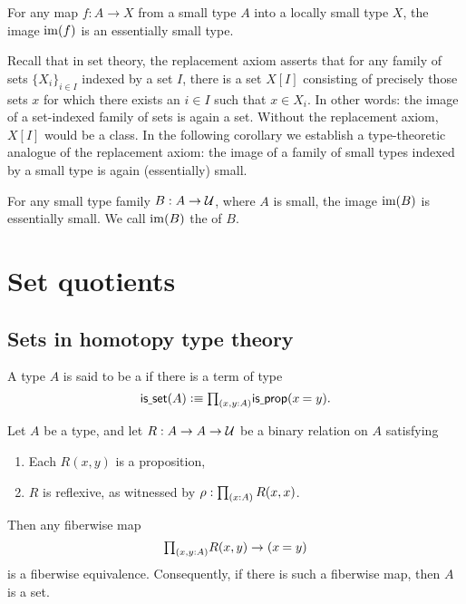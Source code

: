 \begin{thm}\label{thm:image_small}
For any map $f:A\to X$ from a small type $A$ into a locally small type $X$, the image $\operatorname{im}(f)$ is an essentially small type.
\end{thm}

Recall that in set theory, the replacement axiom asserts that for any family of sets $\{X_i\}_{i\in I}$ indexed by a set $I$, there is a set $X[I]$ consisting of precisely those sets $x$ for which there exists an $i\in I$ such that $x\in X_i$. In other words: the image of a set-indexed family of sets is again a set. Without the replacement axiom, $X[I]$ would be a class. In the following corollary we establish a type-theoretic analogue of the replacement axiom: the image of a family of small types indexed by a small type is again (essentially) small.

\begin{cor}\label{cor:im_small}
For any small type family $B:A\to\mathcal{U}$, where $A$ is small, the image $\operatorname{im}(B)$ is essentially small. We call $\operatorname{im}(B)$ the  of $B$. 
\end{cor}

\section{Set quotients}

\subsection{Sets in homotopy type theory}
\begin{defn}
A type $A$ is said to be a  if there is a term of type
\begin{equation*}
\isset(A)\defeq \prd{x,y:A}\isprop(\id{x}{y}).
\end{equation*}
\end{defn}

\begin{lem}\label{lem:prop_to_id}
Let $A$ be a type, and let $R:A\to A\to\mathcal{U}$ be a binary relation on $A$ satisfying
\begin{enumerate}
\item Each $R(x,y)$ is a proposition,
\item $R$ is reflexive, as witnessed by $\rho:\prd{x:A}R(x,x)$.
\end{enumerate}
Then any fiberwise map
\begin{equation*}
\prd{x,y:A}R(x,y)\to (\id{x}{y})
\end{equation*}
is a fiberwise equivalence. Consequently, if there is such a fiberwise map, then $A$ is a set.
\end{lem}

